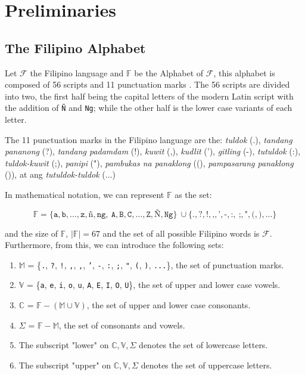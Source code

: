 \section{Preliminaries}
\subsection{The Filipino Alphabet}

Let \(\mathcal{F}\) the Filipino language
and \(\mathbb{F}\) be the Alphabet of \(\mathcal{F}\), this alphabet is
composed of 56 scripts and 11 punctuation marks \cite{OOP}. The 56 scripts are divided into
two, the first half being the capital letters of the modern Latin script with
the addition of \texttt{Ñ} and \texttt{Ng}; while the other half is the lower case variants
of each letter.

The 11 punctuation marks in the Filipino language are the: \textit{tuldok} (.),
\textit{tandang pananong} (?), \textit{tandang padamdam} (!), \textit{kuwit} (,),
\textit{kudlit} ('), \textit{gitling} (-), \textit{tutuldok} (:),
\textit{tuldok-kuwit} (;), \textit{panipi} ("), \textit{pambukas na panaklong}
((), \textit{pampasarang panaklong} ()), at ang \textit{tutuldok-tuldok} (...)

In mathematical notation, we can represent \(\mathbb{F}\) as the set:

\[
      \mathbb{F} = \{\texttt{a},\texttt{b},\dots,\texttt{z},\texttt{ñ},\texttt{ng},   \
      \texttt{A},\texttt{B},\texttt{C},\dots,\texttt{Z},\texttt{Ñ},\texttt{Ng}\}         \
      \cup \{\texttt{.},\texttt{?},\texttt{!},\texttt{,},\texttt{'},\texttt{-},\texttt{:}, \
      \texttt{;},\texttt{"},\texttt{(},\texttt{)}, \texttt{...}\}
\]

and the size of \(\mathbb{F}\), \(\mid\mathbb{F}\mid = 67\) and the set of all possible Filipino words is $\mathcal{F}$. Furthermore, from this, we can introduce the following sets:
\begin{enumerate}
      \item \(\mathbb{M}\) = \{\texttt{.}, \texttt{?}, \texttt{!}, \texttt{,}, \texttt{,}, \texttt{'}, \texttt{-}, \texttt{:}, \texttt{;}, \texttt{"}, \texttt{(}, \texttt{)}, \texttt{...}\}, the set of punctuation marks.
      \item \(\mathbb{V}\) = \{\texttt{a}, \texttt{e}, \texttt{i}, \texttt{o}, \texttt{u}, \texttt{A}, \texttt{E}, \texttt{I}, \texttt{O}, \texttt{U}\}, the set of upper and lower case vowels.
      \item \(\mathbb{C}\) = \(\mathbb{F} - (\mathbb{M} \cup \mathbb{V})\),
            the set of upper and lower case consonants.
      \item \(\Sigma\) = \(\mathbb{F} - \mathbb{M}\), the set of consonants and vowels.
      \item The subscript "lower" on \(\mathbb{C}, \mathbb{V}, \Sigma\) denotes the set of lowercase letters.
      \item The subscript "upper" on \(\mathbb{C}, \mathbb{V}, \Sigma\) denotes the set of uppercase letters.
\end{enumerate}


